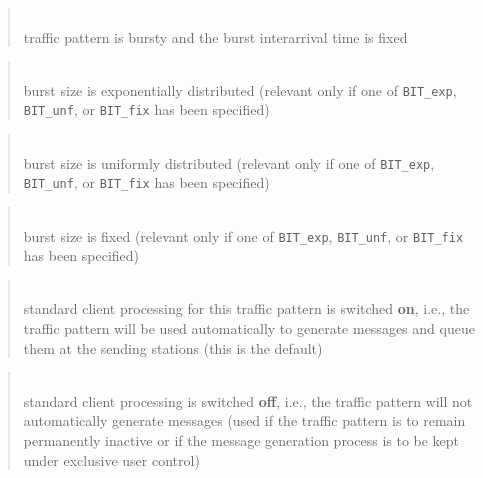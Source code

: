 \begin{quote}
\noindent{}\\ \hspace{0in}
traffic pattern is bursty and the burst interarrival time is fixed
\end{quote}

\begin{quote}
\noindent{}\\ \hspace{0in}
burst size is exponentially distributed
(relevant only if one of {\tt BIT\_exp}, {\tt BIT\_unf}, or {\tt BIT\_fix}
has been specified)
\end{quote}

\begin{quote}
\noindent{}\\ \hspace{0in}
burst size is uniformly distributed
(relevant only if one of {\tt BIT\_exp}, {\tt BIT\_unf}, or {\tt BIT\_fix}
has been specified)
\end{quote}

\begin{quote}
\noindent{}\\ \hspace{0in}
burst size is fixed
(relevant only if one of {\tt BIT\_exp}, {\tt BIT\_unf}, or {\tt BIT\_fix}
has been specified)
\end{quote}

\begin{quote}
\noindent{}\\ \hspace{0in}
standard client processing for this traffic pattern is switched {\bf on},
i.e., the traffic pattern will be used automatically to generate
messages and queue them at the sending stations (this is the default)
\end{quote}

\begin{quote}
\noindent{}\\ \hspace{0in}
standard client processing is switched {\bf off}, i.e., the traffic pattern
will not automatically generate messages
(used if the traffic pattern is to
remain permanently
inactive or if the message generation process is to be kept under exclusive
user control)
\end{quote}


